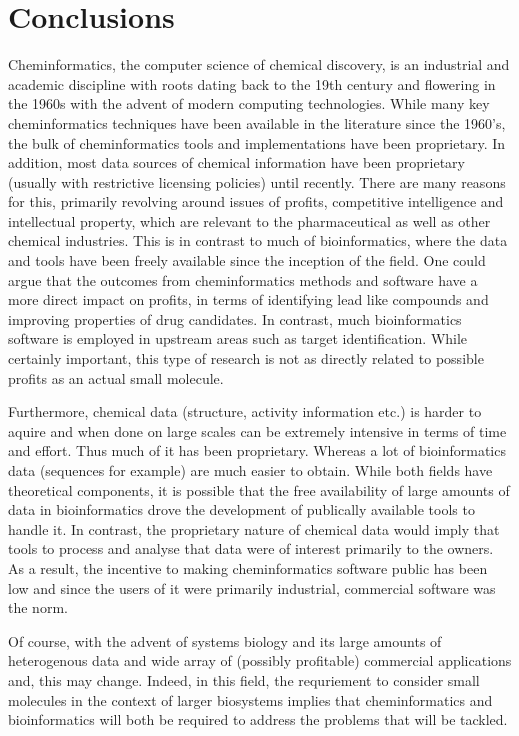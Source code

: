 \documentclass{sig-alternate}
\begin{document}
%
\section{Conclusions}
\label{sec:conclusions}
Cheminformatics, the computer science of chemical discovery, is an
industrial and academic discipline with roots dating back to the 19th
century and flowering in the 1960s with the advent of modern computing
technologies. While many key cheminformatics techniques have been
available in the literature since the 1960's, the bulk of
cheminformatics tools and implementations have been proprietary. In
addition, most data sources of chemical information have been
proprietary (usually with restrictive licensing policies) until
recently. There are many reasons for this, primarily revolving around
issues of profits, competitive intelligence and intellectual property,
which are relevant to the pharmaceutical as well as other chemical
industries. This is in contrast to much of bioinformatics, where the
data and tools have been freely available since the inception of the
field. One could argue that the outcomes from cheminformatics methods
and software have a more direct impact on profits, in terms of
identifying lead like compounds and improving properties of drug    
candidates. In contrast, much bioinformatics software is employed in
upstream areas such as target identification.  While certainly
important, this type of research is not as directly related to
possible profits as an actual small molecule.

Furthermore, chemical data (structure, activity information etc.) is
harder to aquire and when done on large scales can be extremely
intensive in terms of time and effort. Thus much of it has been
proprietary. Whereas a lot of bioinformatics data (sequences for
example) are much easier to obtain. While both fields have theoretical
components, it is possible that the free availability of large amounts
of data in bioinformatics drove the development of publically
available tools to handle it. In contrast, the proprietary nature of
chemical data would imply that tools to process and analyse that data
were of interest primarily to the owners. As a result, the incentive
to making cheminformatics software public has been low and since the
users of it were primarily industrial, commercial software was the
norm.

Of course, with the advent of systems biology and its large amounts of
heterogenous data and wide array of (possibly profitable) commercial
applications and, this may change. Indeed, in this field, the
requriement to consider small molecules in the context of larger
biosystems implies that cheminformatics and bioinformatics will both
be required to address the problems that will be tackled.
\end{document}
